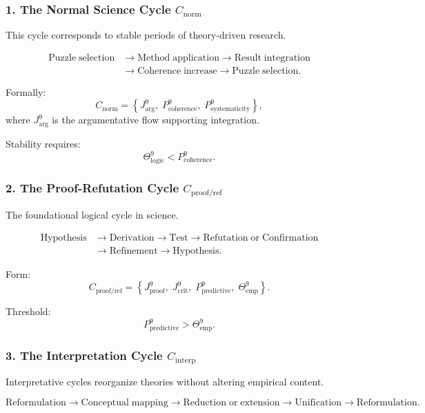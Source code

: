 \subsubsection{1. The Normal Science Cycle $C_{\mathrm{norm}}$}

This cycle corresponds to stable periods of theory-driven research.

\[
  \begin{aligned}
  \mathrm{Puzzle\;selection}
  &\to \mathrm{Method\;application}
  \to \mathrm{Result\;integration}\\
  &\to \mathrm{Coherence\;increase}
  \to \mathrm{Puzzle\;selection}.
  \end{aligned}
\]

Formally:
\[
 C_{\mathrm{norm}}
 =
 \left\{
   J^9_{\mathrm{arg}},\;
   P^9_{\mathrm{coherence}},\;
   P^9_{\mathrm{systematicity}}
 \right\},
\]
where $J^9_{\mathrm{arg}}$ is the argumentative flow supporting integration.

Stability requires:
\[
  \Theta^9_\mathrm{logic} < P^9_{\mathrm{coherence}}.
\]


\subsubsection{2. The Proof-Refutation Cycle $C_{\mathrm{proof/ref}}$}

The foundational logical cycle in science.

\[
  \begin{aligned}
  \mathrm{Hypothesis}
  &\to \mathrm{Derivation}
  \to \mathrm{Test}
  \to \mathrm{Refutation\;or\;Confirmation}\\
  &\to \mathrm{Refinement}
  \to \mathrm{Hypothesis}.
  \end{aligned}
\]

Form:
\[
 C_{\mathrm{proof/ref}}
  =
  \left\{
    J^9_{\mathrm{proof}},\;
    J^9_{\mathrm{crit}},\;
    P^9_{\mathrm{predictive}},\;
    \Theta^9_{\mathrm{emp}}
  \right\}.
\]

Threshold:
\[
  P^9_{\mathrm{predictive}} > \Theta^9_\mathrm{emp}.
\]


\subsubsection{3. The Interpretation Cycle $C_{\mathrm{interp}}$}

Interpretative cycles reorganize theories without altering empirical content.

\[
  \mathrm{Reformulation}
  \to
  \mathrm{Conceptual\;mapping}
  \to
  \mathrm{Reduction\;or\;extension}
  \to
  \mathrm{Unification}
  \to
  \mathrm{Reformulation}.
\]

